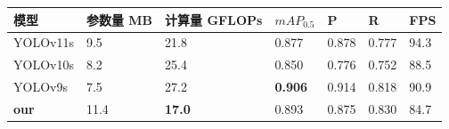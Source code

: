 \begin{table}[htbp]
    \centering
    \captionsetup{font=footnotesize}
    \label{tab:compare_studies_fogtt100k}
    \begin{tabular}{p{}p{}p{}p{}p{}p{}p{}}
        \toprule
        模型       & 参数量 MB & 计算量 GFLOPs & $mAP_{0.5}$   & P     & R     & FPS \\ 
        \midrule
        YOLOv11s     & 9.5           & 21.8          & 0.877          & 0.878  & 0.777 & 94.3 \\
        YOLOv10s     & 8.2           & 25.4          & 0.850          & 0.776  & 0.752 & 88.5 \\
        YOLOv9s      & 7.5           & 27.2          & \textbf{0.906} & 0.914  & 0.818 & 90.9 \\
        \textbf{our} & 11.4          & \textbf{17.0} & 0.893          & 0.875  & 0.830 & 84.7 \\
        \bottomrule
    \end{tabular}
\end{table}

